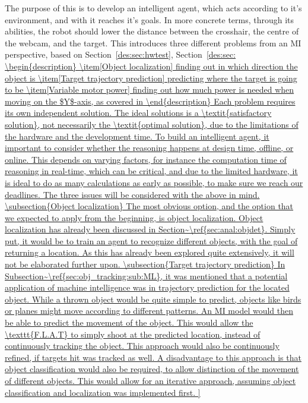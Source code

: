 The purpose of this is to develop an intelligent agent, which acts according to it's environment, and with it reaches it's goals.
In more concrete terms, through its abilities, the robot should lower the distance between the crosshair, the centre of the webcam, and the target.
This introduces three different problems from an MI perspective, based on Section~\ref{des:sec:hwtest}, Section~\ref{des:sec:
\begin{description}
	\item[Object localization] finding out in which direction the object is
	\item[Target trajectory prediction] predicting where the target is going to be
	\item[Variable motor power] finding out how much power is needed when moving on the $Y$-axis, as covered in
\end{description}


Each problem requires its own independent solution.
The ideal solutions is a \textit{satisfactory solution}, not necessarily the \textit{optimal solution}, due to the limitations of the hardware and the development time.
To build an intelligent agent, it important to consider whether the reasoning happens at design time, offline, or online.
This depends on varying factors, for instance the computation time of reasoning in real-time, which can be critical, and due to the limited hardware, it is ideal to do as many calculations as early as possible, to make sure we reach our deadlines.
The three issues will be considered with the above in mind.

\subsection{Object localization}
The most obvious option, and the option that we expected to apply from the beginning, is object localization.
Object localization has already been discussed in Section~\ref{sec:anal:objdet}.
Simply put, it would be to train an agent to recognize different objects, with the goal of returning a location.
As this has already been explored quite extensively, it will not be elaborated further upon.

\subsection{Target trajectory prediction}
In Subsection~\ref{sec:obj_tracking:sub:ML}, it was mentioned that a potential application of machine intelligence was in trajectory prediction for the located object.
While a thrown object would be quite simple to predict, objects like birds or planes might move according to different patterns.
An MI model would then be able to predict the movement of the object.
This would allow the \texttt{F.L.A.T} to simply shoot at the predicted location, instead of continuously tracking the object.
This approach would also be continuously refined, if targets hit was tracked as well.
A disadvantage to this approach is that object classification would also be required, to allow distinction of the movement of different objects.
This would allow for an iterative approach, assuming object classification and localization was implemented first.

}
